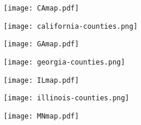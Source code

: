 \documentclass[10pt]{article}
\begin{document}
\maketitle

\begin{figure} 
  \begin{center}
    \texttt{[image: CAmap.pdf]}
  \end{center}
\end{figure}

\begin{figure} 
  \begin{center}
    \texttt{[image: california-counties.png]}
  \end{center}
\end{figure}

\begin{landscape}

\end{landscape}

\begin{figure} 
  \begin{center}
    \texttt{[image: GAmap.pdf]}
  \end{center}
\end{figure}

\begin{figure} 
  \begin{center}
    \texttt{[image: georgia-counties.png]}
  \end{center}
\end{figure}

\begin{landscape}

\end{landscape}

\begin{figure} 
  \begin{center}
    \texttt{[image: ILmap.pdf]}
  \end{center}
\end{figure}

\begin{figure} 
  \begin{center}
    \texttt{[image: illinois-counties.png]}
  \end{center}
\end{figure}

\begin{landscape}

\end{landscape}

\begin{figure} 
  \begin{center}
    \texttt{[image: MNmap.pdf]}
  \end{center}
\end{figure}
\end{document}
